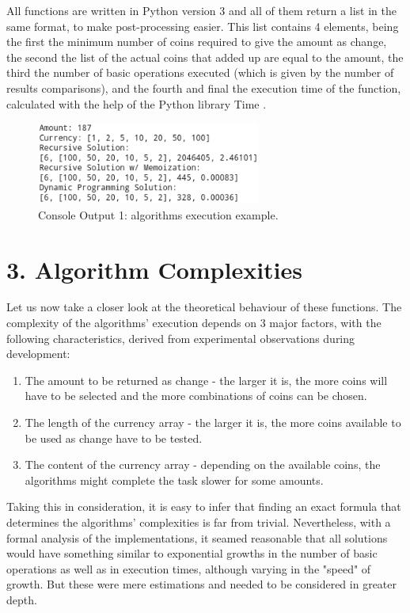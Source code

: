 \documentclass[shortpaper]{revdetua}
\begin{document}
All functions are written in Python version 3 and all of them return a list in 
the same format, to make post-processing easier.
This list contains 4 elements, being the first the minimum number of coins 
required to give the amount as change, the second the list of the actual coins 
that added up are equal to the amount, the third the number of basic operations 
executed (which is given by the number of results comparisons), and the fourth 
and final the execution time of the function, calculated with the help 
of the Python library Time \cite{time}.

\captionsetup[figure]{labelformat=empty}
\begin{figure}[H]
    \centering
    \setlength{\belowcaptionskip}{-10pt}
    \includegraphics[width=2.9in]{../results/results_example.png}
    \caption{Console Output 1: algorithms execution example.}
    \label{code:1}
\end{figure}

\section*{3. Algorithm Complexities}

Let us now take a closer look at the theoretical behaviour of these functions.
The complexity of the algorithms' execution depends on 3 major factors, with the 
following characteristics, derived from experimental observations during
development: 
\begin{enumerate}
    \item The amount to be returned as change - the larger it is, the more coins
will have to be selected and the more combinations of coins can be chosen.
    \item The length of the currency array - the larger it is, the more coins 
available to be used as change have to be tested.
    \item The content of the currency array - depending on the available coins,
the algorithms might complete the task slower for some amounts.
\end{enumerate}

Taking this in consideration, it is easy to infer that finding an exact formula 
that determines the algorithms' complexities is far from trivial.
Nevertheless, with a formal analysis of the implementations, it seamed reasonable
that all solutions would have something similar to exponential growths in the 
number of basic operations as well as in execution times, although varying in 
the "speed" of growth.
But these were mere estimations and needed to be considered in greater depth.
\end{document}
